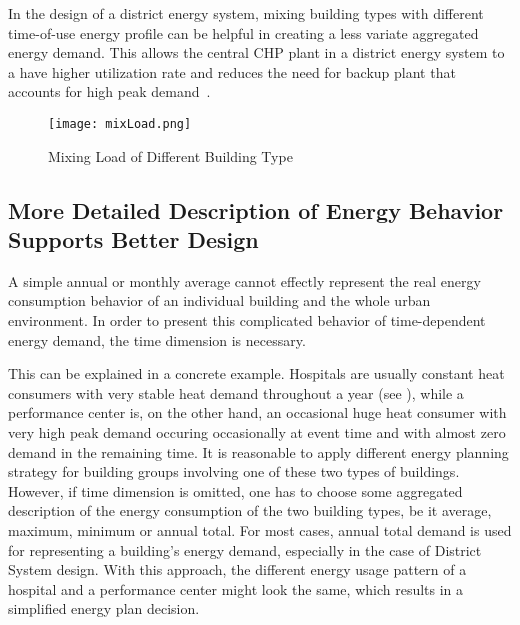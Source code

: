 In the design of a district energy system, mixing building types with
different time-of-use energy profile can be helpful in creating a less
variate aggregated energy demand. This allows the central CHP plant in
a district energy system to a have higher utilization rate and reduces
the need for backup plant that accounts for high peak
demand~\cite{decentralHeatMap2011}.

\begin{figure}[h!]
  \centering
  \texttt{[image: mixLoad.png]}
  \caption[Mixing Load Graph]{Mixing Load of Different Building
    Type~\cite{decentralHeatMap2011}}
  \label{fig:mixLoad}
\end{figure}

\subsection{More Detailed Description of Energy Behavior Supports
  Better Design}
A simple annual or monthly average cannot effectly represent the real
energy consumption behavior of an individual building and the whole
urban environment. In order to present this complicated behavior of
time-dependent energy demand, the time dimension is necessary.

This can be explained in a concrete example. Hospitals are usually
constant heat consumers with very stable heat demand throughout a year
(see ), while a performance center is, on the other hand,
an occasional huge heat consumer with very high peak demand occuring
occasionally at event time and with almost zero demand in the
remaining time. It is reasonable to apply different energy planning
strategy for building groups involving one of these two types of
buildings. However, if time dimension is omitted, one has to choose
some aggregated description of the energy consumption of the two
building types, be it average, maximum, minimum or annual total. For
most cases, annual total demand is used for representing a building's
energy demand, especially in the case of District System design. With
this approach, the different energy usage pattern of a hospital and a
performance center might look the same, which results in a simplified
energy plan decision.

